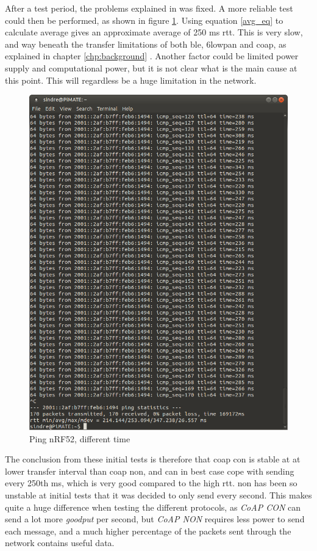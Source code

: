 After a test period, the problems explained in  was fixed. A more reliable test could then be performed, as shown in figure \ref{fig:ping2}. Using equation \ref{avg_eq} to calculate average gives an approximate average of 250 ms \gls{rtt}. This is very slow, and way beneath the transfer limitations of both \gls{ble}, \gls{6lowpan} and \gls{coap}, as explained in chapter \ref{chp:background} . Another factor could be limited power supply and computational power, but it is not clear what is the main cause at this point. This will regardless be a huge limitation in the network. 

\begin{figure}[ht]
    \centering
    \includegraphics[scale=0.4]{ping3.png}    
    \caption{Ping nRF52, different time}
    \label{fig:ping2}
\end{figure}


The conclusion from these initial tests is therefore that \gls{coap} \gls{con} is stable at at lower transfer interval than \gls{coap} \gls{non}, and can in best case cope with sending every 250th ms, which is very good compared to the high \gls{rtt}. \gls{non} has been so unstable at initial tests that it was decided to only send every second. This makes quite a huge difference when testing the different protocols, as \textit{CoAP CON} can send a lot more \textit{goodput} per second, but \textit{CoAP NON} requires less power to send each message, and a much higher percentage of the packets sent through the network contains useful data.


